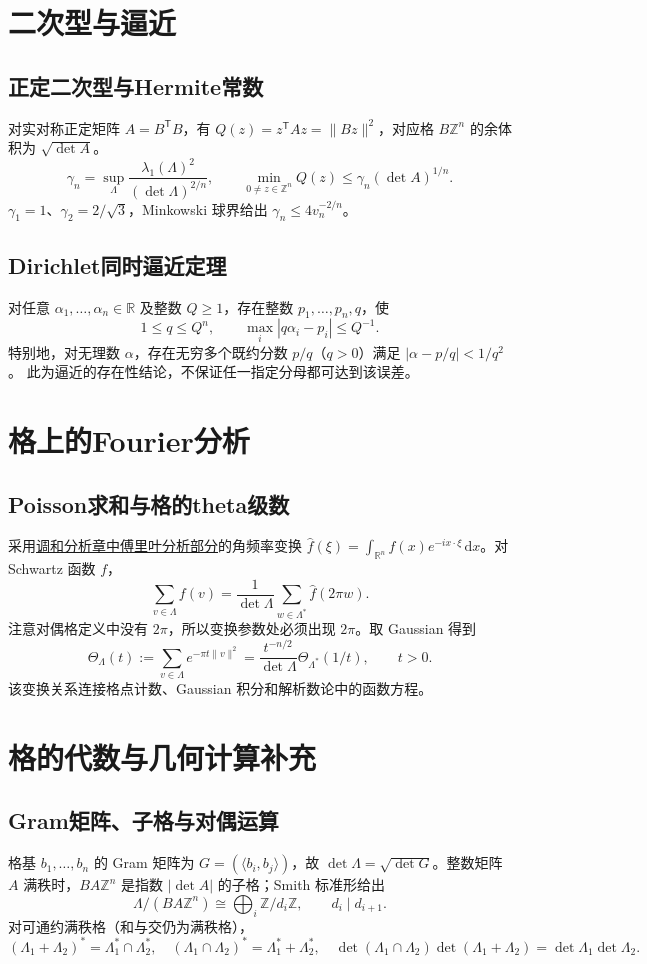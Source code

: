\documentclass[../main.tex]{subfiles}
\begin{document}
\section{二次型与逼近}
\subsection{正定二次型与Hermite常数}
对实对称正定矩阵 $A=B^{\mathsf T}B$，有 $Q(z)=z^{\mathsf T}Az=\|Bz\|^2$，对应格 $B\mathbb Z^n$ 的余体积为 $\sqrt{\det A}$。
\[
\gamma_n=\sup_\Lambda\frac{\lambda_1(\Lambda)^2}{(\det\Lambda)^{2/n}},\qquad
\min_{0\ne z\in\mathbb Z^n}Q(z)\le\gamma_n(\det A)^{1/n}.
\]
$\gamma_1=1$、$\gamma_2=2/\sqrt3$，Minkowski 球界给出 $\gamma_n\le4v_n^{-2/n}$。
\subsection{Dirichlet同时逼近定理}
对任意 $\alpha_1,\ldots,\alpha_n\in\mathbb R$ 及整数 $Q\ge1$，存在整数 $p_1,\ldots,p_n,q$，使
\[
1\le q\le Q^n,\qquad\max_i|q\alpha_i-p_i|\le Q^{-1}.
\]
特别地，对无理数 $\alpha$，存在无穷多个既约分数 $p/q$（$q>0$）满足 $|\alpha-p/q|<1/q^2$。
此为逼近的存在性结论，不保证任一指定分母都可达到该误差。
\section{格上的Fourier分析}
\subsection{Poisson求和与格的theta级数}
采用\hyperref[sec:harmonic-fourier]{调和分析章中傅里叶分析部分}的角频率变换 $\widehat f(\xi)=\int_{\mathbb R^n}f(x)e^{-ix\cdot\xi}\,\mathrm dx$。对 Schwartz 函数 $f$，
\[
\sum_{v\in\Lambda}f(v)=\frac1{\det\Lambda}\sum_{w\in\Lambda^*}\widehat f(2\pi w).
\]
注意对偶格定义中没有 $2\pi$，所以变换参数处必须出现 $2\pi$。取 Gaussian 得到
\[
\Theta_\Lambda(t):=\sum_{v\in\Lambda}e^{-\pi t\|v\|^2}
=\frac{t^{-n/2}}{\det\Lambda}\Theta_{\Lambda^*}(1/t),\qquad t>0.
\]
该变换关系连接格点计数、Gaussian 积分和解析数论中的函数方程。
\section{格的代数与几何计算补充}
\subsection{Gram矩阵、子格与对偶运算}
格基 $b_1,\ldots,b_n$ 的 Gram 矩阵为 $G=(\langle b_i,b_j\rangle)$，故 $\det\Lambda=\sqrt{\det G}$。整数矩阵 $A$ 满秩时，$BA\mathbb Z^n$ 是指数 $|\det A|$ 的子格；Smith 标准形给出
\[
\Lambda/(BA\mathbb Z^n)\cong\bigoplus_i\mathbb Z/d_i\mathbb Z,\qquad d_i\mid d_{i+1}.
\]
对可通约满秩格（和与交仍为满秩格），
\[
(\Lambda_1+\Lambda_2)^*=\Lambda_1^*\cap\Lambda_2^*,\quad
(\Lambda_1\cap\Lambda_2)^*=\Lambda_1^*+\Lambda_2^*,\quad
\det(\Lambda_1\cap\Lambda_2)\det(\Lambda_1+\Lambda_2)=\det\Lambda_1\det\Lambda_2.
\]
\end{document}
